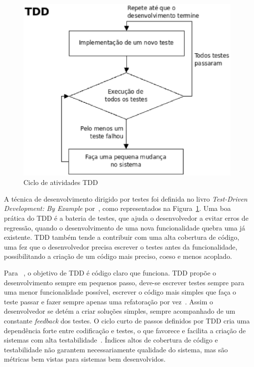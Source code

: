 \begin{figure}[h]
    \centering
    \includegraphics[keepaspectratio=true,scale=0.50]
      {figuras/tdd_ciclo.eps}
    \caption{Ciclo de atividades TDD~\cite{beck2002}}
    \label{tdd_ciclo}
\end{figure}

A técnica de desenvolvimento dirigido por testes foi definida no 
livro \textit{Test-Driven Development: By Example} por~, como
representados na Figura~\ref{tdd_ciclo}.
%
Uma boa prática do TDD é a bateria de testes, que ajuda o desenvolvedor a evitar 
erros de regressão, quando o desenvolvimento de uma nova funcionalidade quebra uma 
já existente.
%
TDD também tende a contribuir com uma alta cobertura de código, uma 
fez que o desenvolvedor precisa escrever o testes antes da funcionalidade, 
possibilitando a criação de um código mais preciso, coeso e menos acoplado. 

Para ~, o objetivo de TDD é código claro que 
funciona.
%
TDD propõe o desenvolvimento sempre em pequenos passo, deve-se escrever testes sempre 
para uma menor funcionalidade possível, escrever o código mais simples que faça o 
teste passar e fazer sempre apenas uma refatoração por vez~\cite{beck2002}. Assim o 
desenvolvedor se detém a criar soluções simples, sempre acompanhado de um constante 
\textit{feedback} dos testes.
%
O ciclo curto de passos definidos por TDD cria uma dependência forte entre codificação 
e testes, o que favorece e facilita a criação de sistemas com alta testabilidade~\cite{bernardo2011}. 
%
Índices altos de cobertura de código e testabilidade não garantem necessariamente 
qualidade do sistema, mas são métricas bem vistas para sistemas bem desenvolvidos.

